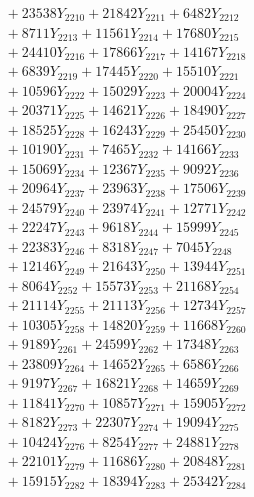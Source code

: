 \documentclass[a4paper,10pt]{article}
\begin{document}
{\begin{align}
&\;  + 23538 Y_{2210} + 21842 Y_{2211} + 6482 Y_{2212} \\[0.3ex]
&\;  + 8711 Y_{2213} + 11561 Y_{2214} + 17680 Y_{2215} \\[0.3ex]
&\;  + 24410 Y_{2216} + 17866 Y_{2217} + 14167 Y_{2218} \\[0.5ex]\allowbreak
&\;  + 6839 Y_{2219} + 17445 Y_{2220} + 15510 Y_{2221} \\[0.3ex]
&\;  + 10596 Y_{2222} + 15029 Y_{2223} + 20004 Y_{2224} \\[0.3ex]
&\;  + 20371 Y_{2225} + 14621 Y_{2226} + 18490 Y_{2227} \\[0.3ex]
&\;  + 18525 Y_{2228} + 16243 Y_{2229} + 25450 Y_{2230} \\[0.3ex]
&\;  + 10190 Y_{2231} + 7465 Y_{2232} + 14166 Y_{2233} \\[0.3ex]
&\;  + 15069 Y_{2234} + 12367 Y_{2235} + 9092 Y_{2236} \\[0.3ex]
&\;  + 20964 Y_{2237} + 23963 Y_{2238} + 17506 Y_{2239} \\[0.3ex]
&\;  + 24579 Y_{2240} + 23974 Y_{2241} + 12771 Y_{2242} \\[0.3ex]
&\;  + 22247 Y_{2243} + 9618 Y_{2244} + 15999 Y_{2245} \\[0.3ex]
&\;  + 22383 Y_{2246} + 8318 Y_{2247} + 7045 Y_{2248} \\[0.5ex]\allowbreak
&\;  + 12146 Y_{2249} + 21643 Y_{2250} + 13944 Y_{2251} \\[0.3ex]
&\;  + 8064 Y_{2252} + 15573 Y_{2253} + 21168 Y_{2254} \\[0.3ex]
&\;  + 21114 Y_{2255} + 21113 Y_{2256} + 12734 Y_{2257} \\[0.3ex]
&\;  + 10305 Y_{2258} + 14820 Y_{2259} + 11668 Y_{2260} \\[0.3ex]
&\;  + 9189 Y_{2261} + 24599 Y_{2262} + 17348 Y_{2263} \\[0.3ex]
&\;  + 23809 Y_{2264} + 14652 Y_{2265} + 6586 Y_{2266} \\[0.3ex]
&\;  + 9197 Y_{2267} + 16821 Y_{2268} + 14659 Y_{2269} \\[0.3ex]
&\;  + 11841 Y_{2270} + 10857 Y_{2271} + 15905 Y_{2272} \\[0.3ex]
&\;  + 8182 Y_{2273} + 22307 Y_{2274} + 19094 Y_{2275} \\[0.3ex]
&\;  + 10424 Y_{2276} + 8254 Y_{2277} + 24881 Y_{2278} \\[0.5ex]\allowbreak
&\;  + 22101 Y_{2279} + 11686 Y_{2280} + 20848 Y_{2281} \\[0.3ex]
&\;  + 15915 Y_{2282} + 18394 Y_{2283} + 25342 Y_{2284} \\[0.3ex]

\end{align}}
\end{document}
